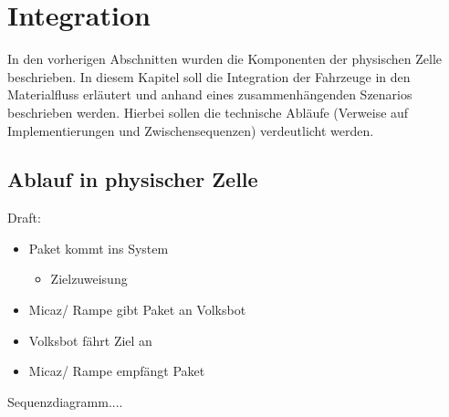 \section{Integration}
In den vorherigen Abschnitten wurden die Komponenten der physischen Zelle beschrieben. In diesem Kapitel soll die Integration der Fahrzeuge in den Materialfluss erläutert und anhand eines zusammenhängenden Szenarios beschrieben werden. Hierbei sollen die technische Abläufe (Verweise auf Implementierungen und Zwischensequenzen) verdeutlicht werden.

\subsection{Ablauf in physischer Zelle}

Draft:

\begin{itemize}
	\item Paket kommt ins System
	\begin{itemize}
 		\item Zielzuweisung
 	\end{itemize}
	\item Micaz/ Rampe gibt Paket an Volksbot
	\item Volksbot fährt Ziel an
	\item Micaz/ Rampe empfängt Paket
\end{itemize}

Sequenzdiagramm....